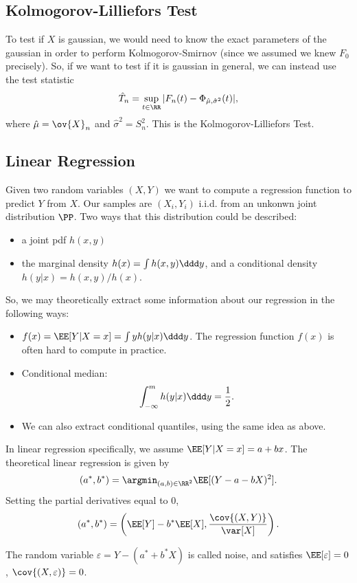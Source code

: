 \subsection{Kolmogorov-Lilliefors Test}

To test if $X$ is gaussian, we would need to know the exact parameters of the gaussian in order to perform Kolmogorov-Smirnov (since we assumed we knew $F_0$ precisely). So, if we want to test if it is gaussian in general, we can instead use the test statistic 
\[\hat{T}_n = \sup_{t\in \RR}\vert F_n(t) - \Phi_{\hat{\mu}, \hat{\sigma}^2}(t)\vert,\]
where $\hat{\mu} = \ov{X}_n$ and $\hat{\sigma}^2 = S_n^2$. This is the \ac{Kolmogorov-Lilliefors Test}. 

\subsection{Linear Regression}

Given two random variables $(X,Y)$ we want to compute a regression function to predict $Y$ from $X$. Our samples are $(X_i, Y_i)$ i.i.d. from an unkonwn joint distribution $\PP$. Two ways that this distribution could be described:
\begin{itemize}
    \item a joint pdf $h(x,y)$
    \item the marginal density $h(x) = \int h(x,y)\ddd y$, and a conditional density $h(y|x) = h(x,y)/h(x)$. 
\end{itemize}

So, we may theoretically extract some information about our regression in the following ways:
\begin{itemize}
    \item $f(x) = \EE[Y | X=x] = \int yh(y|x)\ddd y$. The regression function $f(x)$ is often hard to compute in practice.
    \item Conditional median: 
    \[\int_{-\infty}^m h(y|x)\ddd y = \frac{1}{2}.\]
    \item We can also extract conditional quantiles, using the same idea as above. 
\end{itemize}

In linear regression specifically, we assume $\EE[Y | X=x] = a+bx$. The theoretical linear regression is given by 
\[(a^*, b^*) = \argmin_{(a,b)\in \RR^2}\EE[(Y-a-bX)^2].\]
Setting the partial derivatives equal to $0$, 
\[(a^*, b^*) = \left(\EE[Y] - b^*\EE[X], \frac{\cov{(X, Y)}}{\var[X]}\right).\]

The random variable $\varepsilon = Y - (a^*+b^*X)$ is called \ac{noise}, and satisfies $\EE[\varepsilon] = 0$, $\cov{(X, \varepsilon)} = 0$. 
